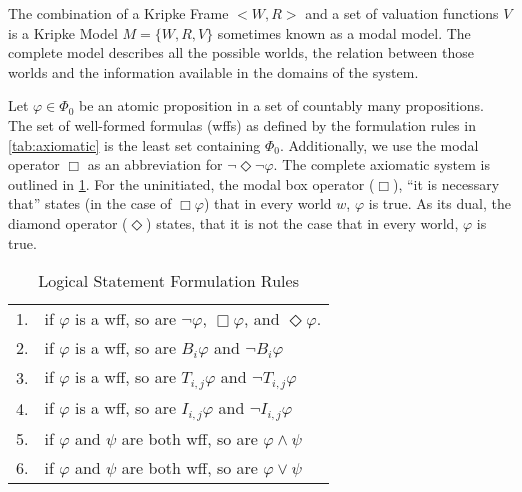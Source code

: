 The combination of a Kripke Frame $< W,R >$ and a set of valuation functions ${V}$ is a Kripke Model $M = \{W, R, V\}$ sometimes known as a modal model. The complete model describes all the possible worlds, the relation between those worlds and the information available in the domains of the system.

Let $\varphi \in \Phi_0$ be an atomic proposition in a set of countably many propositions. The set of well-formed formulas (wffs) as defined by the formulation rules in \ref{tab:axiomatic} is the least set containing $\Phi_0$. Additionally, we use the modal operator $\Box$ as an abbreviation for $\neg \Diamond \neg \varphi$. The complete axiomatic system is outlined in \ref{tab:wffs}. For the uninitiated, the modal box operator ($\Box$), ``it is necessary that'' states (in the case of $\Box \varphi$) that in every world $w$, $\varphi$ is true. As its dual, the diamond operator ($\Diamond$) states, that it is not the case that in every world, $\varphi$ is true.

\begin{table}[]
\small
\centering
\caption{Logical Statement Formulation Rules}
\begin{tabular}{r l}
1. & if $\varphi$ is a wff, so are $\neg \varphi$, $\Box \varphi$, and $\Diamond \varphi$. \\
2. & if $\varphi$ is a wff, so are $B_i \varphi$ and $\neg B_i \varphi$ \\
3. & if $\varphi$ is a wff, so are $T_{i,j} \varphi$ and $\neg T_{i,j} \varphi$ \\
4. & if $\varphi$ is a wff, so are $I_{i,j} \varphi$ and $\neg I_{i,j} \varphi$ \\
5. & if $\varphi$ and $\psi$ are both wff, so are $\varphi \wedge \psi$ \\
6. & if $\varphi$ and $\psi$ are both wff, so are $\varphi \vee \psi$ \\
\end{tabular}
\label{tab:wffs}
\end{table}

